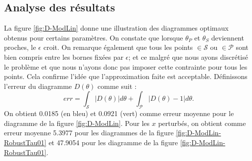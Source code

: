 \subsection{Analyse des résultats}
La figure \ref{fig:D-ModLin} donne une illustration des diagrammes optimaux obtenus pour certains paramètres. On constate que lorsque $\theta_P$ et $\theta_S$ deviennent proches, le $\epsilon$ croit. On remarque également que tous les points $\in \mathcal{S}$ ou $\in \mathcal{P}$ sont bien compris entre les bornes fixées par $\epsilon$; et ce malgré que nous ayons discrétisé le problème et que nous n'ayons donc pas imposer cette contrainte pour tous les points. Cela confirme l'idée que l'approximation faite est acceptable. Définissons l'erreur du diagramme $D(\theta)$ comme suit : 
\begin{equation} \label{eq:erreurDiagramme}
err = \int _{\mathcal{S}} |D(\theta)| d\theta + \int_{\mathcal{P}} |D(\theta) - 1| d\theta.
\end{equation}
On obtient 0.0185 (en bleu) et 0.0921 (vert) comme erreur moyenne pour le diagramme de la figure \ref{fig:D-ModLin}. Pour les $x$ perturbés, on obtient comme erreur moyenne 5.3977 pour les diagrammes de la figure \ref{fig:D-ModLin-RobustTau01} et 47.9054 pour les diagramme de la figure \ref{fig:D-ModLin-RobustTau01}.
